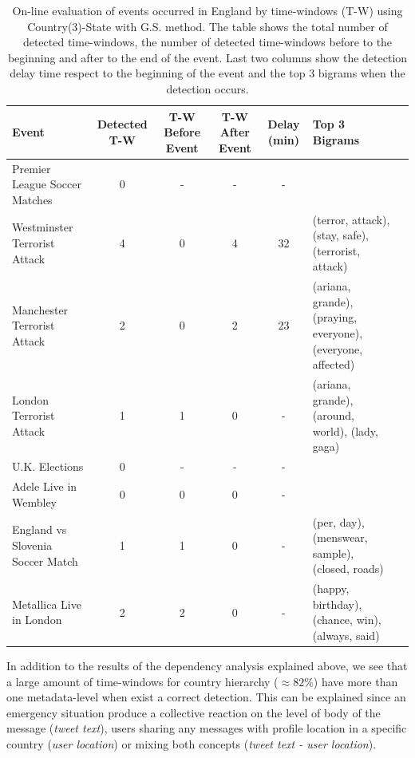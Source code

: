 \documentclass[sigconf]{acmart}
\begin{document}
\begin{table}
	\caption{On-line evaluation of events occurred in England by time-windows (T-W) using Country(3)-State with G.S. method. The table shows the total number of detected time-windows, the number of detected time-windows before to the beginning and after to the end of the event. Last two columns show the detection delay time respect to the beginning of the event and the top 3 bigrams when the detection occurs.}
	\label{tab:online2}
	\begin{tabular}{lccccp{3.5cm}c}
		\toprule
		Event &Detected T-W & T-W Before Event & T-W After Event & Delay (min) & Top 3 Bigrams\\
		\midrule
		Premier League Soccer Matches & 0& - & - & - & \hfill \break \\
		Westminster Terrorist Attack& 4 & 0 &4 & 32& \small{(terror, attack), (stay, safe), (terrorist, attack)}\\
		Manchester Terrorist Attack& 2& 0& 2& 23& \small{(ariana, grande), (praying, everyone), (everyone, affected)}\\
		London Terrorist Attack & 1 & 1 & 0 & - & \small{(ariana, grande), (around, world), (lady, gaga)} \\
		U.K. Elections& 0 & - & - & - & \hfill \break\\
		Adele Live in Wembley& 0& 0&0&-& \hfill \break\\
		England vs Slovenia Soccer Match & 1& 1 & 0 & - & \small{(per, day), (menswear, sample), (closed, roads)}\\
		Metallica Live in London& 2 & 2 & 0 & - & \small{(happy, birthday), (chance, win), (always, said)}\\
		\bottomrule
	\end{tabular}
\end{table}


In addition to the results of the dependency analysis explained above, we see that a large amount of time-windows for country hierarchy ($\approx 82\%$) have more than one metadata-level when exist a correct detection. This can be explained since an emergency situation produce a collective reaction on the level of body of the message (\textit{tweet text}), users sharing any messages with profile location in a specific country (\textit{user location}) or mixing both concepts (\textit{tweet text - user location}).
\end{document}
